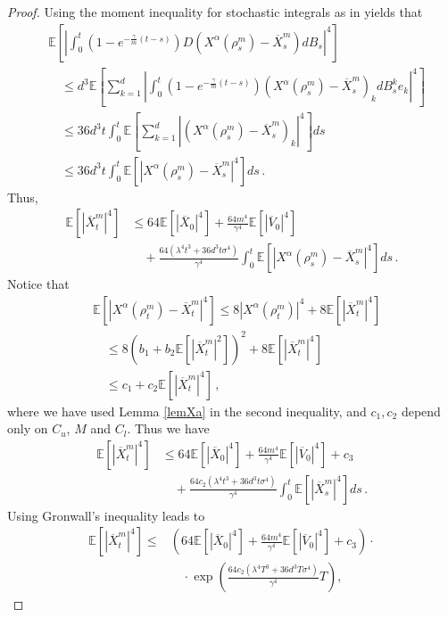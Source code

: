 \documentclass{ims9x6}
\newcommand{\nn}{\nonumber}
\newcommand{\EE}{\mathbb{E}}
\newcommand{\OV}{\overline{V}}
\newcommand{\OX}{\overline{X}}
\begin{document}
\begin{proof}
	Using the moment inequality for stochastic integrals as in \cite[Theorem 7.1]{mao2007stochastic}  yields that
	\begin{align*}
	&\EE\left[\left|\int_0^{t}(1-e^{-\frac{\gamma}{m}(t-s)}) D(X^{\alpha}(\rho_s^m)-\OX_s^m)dB_s\right|^4\right]\nn\\
	&\quad \leq d^3\EE\left[\sum_{k=1}^{d}\left|\int_0^{t}(1-e^{-\frac{\gamma}{m}(t-s)}) (X^{\alpha}(\rho_s^m)-\OX_s^m)_kdB_s^ke_k\right|^4\right]\nn\\
	&\quad \leq 36d^3t\int_0^{t}\EE\left[  \sum_{k=1}^{d}|(X^{\alpha}(\rho_s^m)-\OX_s^m)_k|^4\right] ds\nn\\
	&\quad \leq 36d^3t\int_0^{t}\EE\left[  |X^{\alpha}(\rho_s^m)-\OX_s^m|^4\right] ds\,.
	\end{align*}
	Thus,
	\begin{align*}
	\EE[|\OX_t^m|^4]&\leq 64\EE[|\OX_0|^4]+\frac{64m^4}{\gamma^4}\EE[|\OV_0|^4]\\
	&\quad+\frac{64(\lambda^4t^3+36d^3t\sigma^4)}{\gamma^4}\int_0^t\EE[|X^{\alpha}(\rho_s^m)-\OX_s^m|^4]ds\,.
	\end{align*}
	Notice that
	\begin{equation}
	\label{Jensen}
	\begin{split}
	&\EE[|X^{\alpha}(\rho_t^m)-\OX_t^m|^4]\leq 8 |X^{\alpha}(\rho_t^m)|^4+8\EE[|\OX_t^m|^4]\\
	&\quad \leq 8(b_1+b_2\EE[|\OX_t^m|^2])^2+8\EE[|\OX_t^m|^4]\\
	&\quad \leq c_1+c_2\EE[|\OX_t^m|^4]
	\,,
	\end{split}
	\end{equation}
	where we have used Lemma \ref{lemXa}  in the second inequality, and $c_1,c_2$ depend only on $C_u$, $M$ and $C_l$. Thus we have
	\begin{align*}
	\EE[|\OX_t^m|^4]
	&\leq 64\EE[|\OX_0|^4]+\frac{64m^4}{\gamma^4}\EE[|\OV_0|^4]+c_3\nn\\
	&\quad+\frac{64c_2(\lambda^4t^3+36d^3t\sigma^4)}{\gamma^4}\int_0^t\EE[|\OX_s^m|^4]ds\,.
	\end{align*}
	Using Gronwall's inequality leads to
{\small 	\begin{equation}\label{esOX2}
\begin{split}
	\EE[|\OX_t^m|^4] \leq &\left(64\EE[|\OX_0|^4]+\frac{64m^4}{\gamma^4}\EE[|\OV_0|^4]+c_3\right)\cdot\\
	&\quad\cdot\exp\left(\frac{64c_2(\lambda^4T^3+36d^3T\sigma^4)}{\gamma^4}T\right),
	\end{split}
	\end{equation}}

\end{proof}
\end{document}

